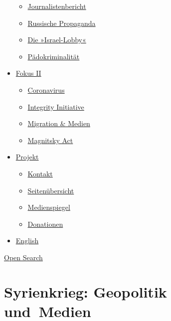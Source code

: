 \begin{itemize}
  \begin{itemize}
  \tightlist
  \item
    \href{https://swprs.org/bericht-eines-journalisten/}{Journalistenbericht}
  \item
    \href{https://swprs.org/russische-propaganda/}{Russische Propaganda}
  \item
    \href{https://swprs.org/die-israel-lobby-fakten-und-mythen/}{Die
    »Israel-Lobby«}
  \item
    \href{https://swprs.org/geopolitik-und-paedokriminalitaet/}{Pädokriminalität}
  \end{itemize}
\item
  \href{https://swprs.org/migration-und-medien/}{Fokus II}

  \begin{itemize}
  \tightlist
  \item
    \href{https://swprs.org/covid-19-hinweis-ii/}{Coronavirus}
  \item
    \href{https://swprs.org/die-integrity-initiative/}{Integrity
    Initiative}
  \item
    \href{https://swprs.org/migration-und-medien/}{Migration \& Medien}
  \item
    \href{https://swprs.org/der-fall-magnitsky/}{Magnitsky Act}
  \end{itemize}
\item
  \href{https://swprs.org/kontakt/}{Projekt}

  \begin{itemize}
  \tightlist
  \item
    \href{https://swprs.org/kontakt/}{Kontakt}
  \item
    \href{https://swprs.org/uebersicht/}{Seitenübersicht}
  \item
    \href{https://swprs.org/medienspiegel/}{Medienspiegel}
  \item
    \href{https://swprs.org/donationen/}{Donationen}
  \end{itemize}
\item
  \href{https://swprs.org/contact/}{English}
\end{itemize}

\protect\hyperlink{}{Open Search}

\hypertarget{syrienkrieg-geopolitik-und-medien}{%
\section{Syrienkrieg: Geopolitik
und~Medien}\label{syrienkrieg-geopolitik-und-medien}}

